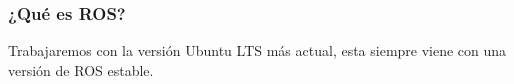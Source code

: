 \begin{frame}
	\frametitle{¿Qué es ROS?}
	  Trabajaremos con la versión Ubuntu LTS más actual, esta siempre viene con una versión de ROS estable.
	
	\begin{figure}[!h]
		\centering
	\end{figure}

\end{frame}

